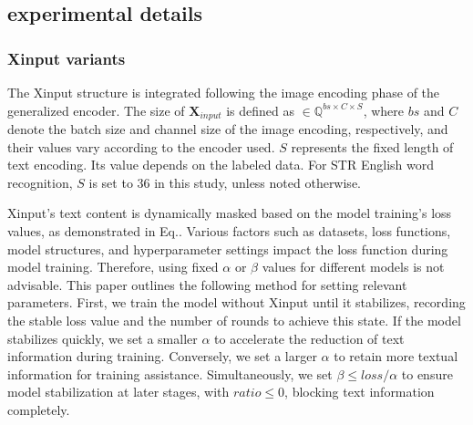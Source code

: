 \documentclass[runningheads]{llncs}
\begin{document}
\subsection{experimental details}
\subsubsection{Xinput variants}
The Xinput structure is integrated following the image encoding phase of the generalized encoder.	The size of $\textbf{X}_{input}$ is defined as $\in\mathbb{Q}^{bs\times C\times S}$, where $bs$ and $C$ denote the batch size and channel size of the image encoding, respectively, and their values vary according to the encoder used.	$S$ represents the fixed length of text encoding.	Its value depends on the labeled data.	For STR English word recognition, $S$ is set to 36 in this study, unless noted otherwise.	

Xinput's text content is dynamically masked based on the model training's loss values, as demonstrated in Eq.\cite{eq:ratio}.	Various factors such as datasets, loss functions, model structures, and hyperparameter settings impact the loss function during model training.	Therefore, using fixed $\alpha$ or $\beta$ values for different models is not advisable.	This paper outlines the following method for setting relevant parameters.	First, we train the model without Xinput until it stabilizes, recording the stable loss value and the number of rounds to achieve this state.	If the model stabilizes quickly, we set a smaller $\alpha$ to accelerate the reduction of text information during training.	Conversely, we set a larger $\alpha$ to retain more textual information for training assistance.	Simultaneously, we set $\beta \leq loss / \alpha$ to ensure model stabilization at later stages, with $ratio \le 0$, blocking text information completely.	
\end{document}
